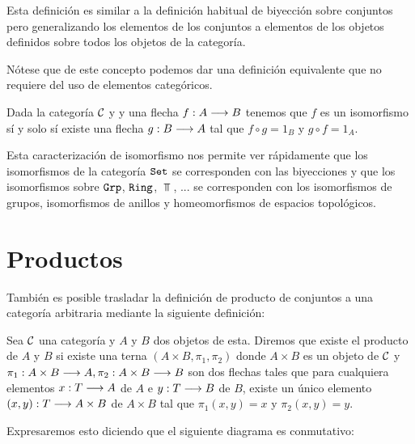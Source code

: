 Esta definición es similar a la definición habitual
de biyección sobre conjuntos pero generalizando los elementos de
los conjuntos a elementos de los objetos definidos sobre todos
los objetos
de la categoría.

Nótese que de este concepto podemos dar una definición equivalente
que no requiere del uso de elementos categóricos.

\begin{proposition}
Dada la categoría $\mathcal{C}$ y y una flecha $f: A\longrightarrow B$ tenemos que
$f$ es un isomorfismo sí y solo sí existe una flecha $g: B\longrightarrow A$
tal que $f \circ g = 1_B$ y $g \circ f = 1_A$.
\end{proposition}


Esta caracterización de isomorfismo nos permite ver rápidamente
que los isomorfismos de la categoría $\texttt{Set}$ se corresponden con las
biyecciones y que los isomorfismos sobre $\texttt{Grp}$, $\texttt{Ring}$, $\Top$, ...
se corresponden con los isomorfismos de grupos,
isomorfismos de anillos y homeomorfismos de espacios topológicos.


\section{Productos}
También es posible trasladar la definición de producto de conjuntos
a una categoría arbitraria mediante la siguiente definición:

\begin{definition}
Sea $\mathcal{C}$ una categoría y $A$ y $B$ dos objetos de esta. Diremos que
existe el producto de $A$ y $B$ si
existe una terna $(A\times B, \pi_1, \pi_2)$
donde $A\times B$ es un objeto de $\mathcal{C}$ y
$\pi_1 : A\times B\longrightarrow A, \pi_2 : A\times B\longrightarrow B$ son dos flechas tales
que para cualquiera elementos $x : T\longrightarrow A$ de $A$ e
$y: T\longrightarrow B$ de $B$, existe un único elemento
$(x,y): T\longrightarrow A\times B$ de $A\times B$ tal que $\pi_1 (x,y)=x$ y $\pi_2(x,y)=y$.

Expresaremos esto diciendo que  el siguiente diagrama es conmutativo:
\begin{center}
\end{center}

\end{definition}

